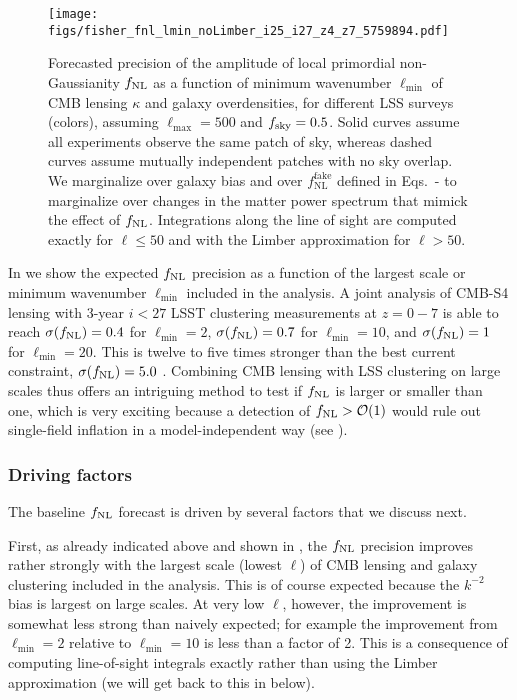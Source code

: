 \documentclass[prd,superscriptaddress,floatfix,notitlepage,nofootinbib,reprint]{revtex4-1} %
\begin{document}
\begin{figure}[tbp]
\texttt{[image: figs/fisher\_fnl\_lmin\_noLimber\_i25\_i27\_z4\_z7\_5759894.pdf]}
\caption{Forecasted precision of the amplitude of local primordial non-Gaussianity ${f_\mathrm{NL}}$ as a function of minimum wavenumber $\ell_\mathrm{min}$ of CMB lensing $\kappa$ and galaxy overdensities, for different LSS surveys (colors), assuming $\ell_\mathrm{max}=500$ and ${f_\mathrm{sky}}=0.5$.
Solid curves assume all experiments observe the same patch of sky, whereas dashed curves assume mutually independent patches with no sky overlap.
We marginalize over galaxy bias and over $f_\mathrm{NL}^\mathrm{fake}$ defined in Eqs.~- to marginalize over changes in the matter power spectrum that mimick the effect of ${f_\mathrm{NL}}$.
Integrations along the line of sight are computed exactly for $\ell\le 50$ and with the Limber approximation for $\ell>50$. 
}
\label{fig:fnl_LSST_S4}
\end{figure}


In  we show the expected ${f_\mathrm{NL}}$ precision as a function of the largest scale or minimum wavenumber $\ell_\mathrm{min}$ included in the analysis.
A joint analysis of CMB-S4 lensing with 3-year $i<27$ LSST clustering measurements at $z=0-7$ is able to reach $\sigma({f_\mathrm{NL}})=0.4$ for $\ell_\mathrm{min}=2$, $\sigma({f_\mathrm{NL}})=0.7$ for $\ell_\mathrm{min}=10$, and $\sigma({f_\mathrm{NL}})=1$ for $\ell_\mathrm{min}=20$.
This is twelve to five times stronger than the best current constraint, $\sigma({f_\mathrm{NL}})=5.0$ \cite{Planck15fnl}.
Combining CMB lensing with LSS clustering on large scales thus offers an intriguing method to test if ${f_\mathrm{NL}}$ is larger or smaller than one, which is very exciting because a detection of ${f_\mathrm{NL}}>\mathcal{O}(1)$ would rule out  single-field inflation in a model-independent way (see ).


\subsubsection{Driving factors}

The baseline ${f_\mathrm{NL}}$ forecast is driven by several factors that we discuss next.

First, as already indicated above and shown in  , the ${f_\mathrm{NL}}$ precision improves rather strongly with the largest scale (lowest $\ell$) of CMB lensing and galaxy clustering included in the analysis. This is of course expected because the $k^{-2}$ bias is largest on large scales.
At very low $\ell$, however, the improvement is somewhat less strong than naively expected; for example the improvement from $\ell_\mathrm{min}=2$ relative to $\ell_\mathrm{min}=10$ is less than a factor of 2.
This is a consequence of computing line-of-sight integrals exactly rather than using the Limber approximation (we will get back to this in  below).
\end{document}
